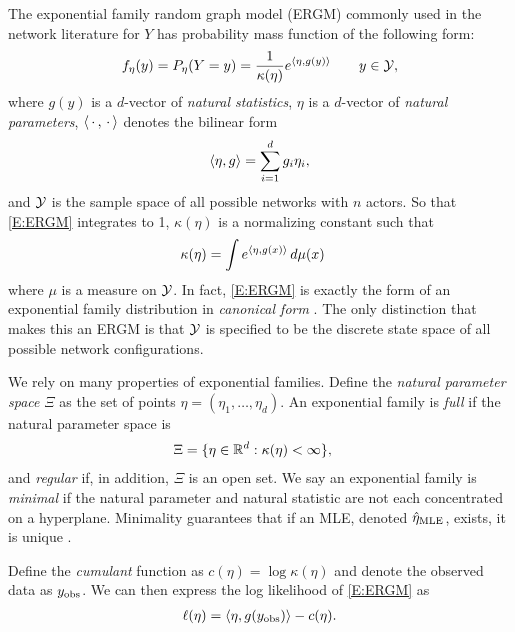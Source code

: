 The exponential family random graph model (ERGM) commonly used in the network 
literature for $Y$ has probability mass function of the following form:
\begin{align}
	f_\eta(y) = P_{\eta}(Y=y) = \frac{1}{ \kappa( \eta) } e^{ \langle  \eta, g(y) \rangle  } \qquad y \in {\mathcal Y}, \label{E:ERGM}
\end{align}
where $g(y)$ is a $d$-vector of \emph{natural statistics}, $\eta$ is a 
$d$-vector of \emph{natural parameters}, 
$\langle \,\cdot\,,\,\cdot\, \rangle$ denotes the bilinear form
\begin{align*}
	\langle  \eta, g  \rangle = \sum_{i=1}^d g_i \eta_i,
\end{align*}
and ${\mathcal Y}$ is the sample space of all possible networks with $n$ actors.
So that \eqref{E:ERGM} integrates to 1, $\kappa(\eta)$ is a normalizing constant such that
\begin{align}
   \kappa(\eta) &= \int e^{ \langle  \eta, g(x) \rangle  } \, d \mu(x) \label{E:kappa}
\end{align}
where $\mu$ is a measure on ${\mathcal Y}$.  In fact, \eqref{E:ERGM} is exactly the form of 
an exponential family distribution in \emph{canonical form} \citep[Chapter 1.4]{tpe}.  The only distinction that makes this an ERGM is that ${\mathcal Y}$ is specified to be the 
discrete state space of all possible network configurations.

We rely on many properties of exponential families.  Define 
the \emph{natural parameter space} $\Xi$ as the set of points
$\eta = (\eta_1, \ldots, \eta_d)$.
An exponential family is \emph{full} if the natural parameter  space is
\begin{align} \label{E:paramspace}
   \Xi &= \{ \eta \in {\mathbb R}^d : \kappa(\eta) < \infty \},  
\end{align}
 and \emph{regular} if, in addition, $\Xi$ is an open set.
We say an exponential family is \emph{minimal} if the natural parameter  and 
natural statistic are not each concentrated on a hyperplane. 
Minimality guarantees that if an MLE, denoted $\hat{\eta}_{\textrm{MLE}}$, exists, 
it is unique \citep{Geyer:gdor}.


Define the \emph{cumulant} function as $c(\eta) = \log \kappa(\eta)$ and
denote the observed data as $y_{\text{obs}}$.  We can then express 
the log likelihood of \eqref{E:ERGM} as
\begin{align}
	\ell( \eta ) = \langle  \eta, g(y_{\text{obs}}) \rangle - c( \eta). \label{E:loglike}
\end{align}

